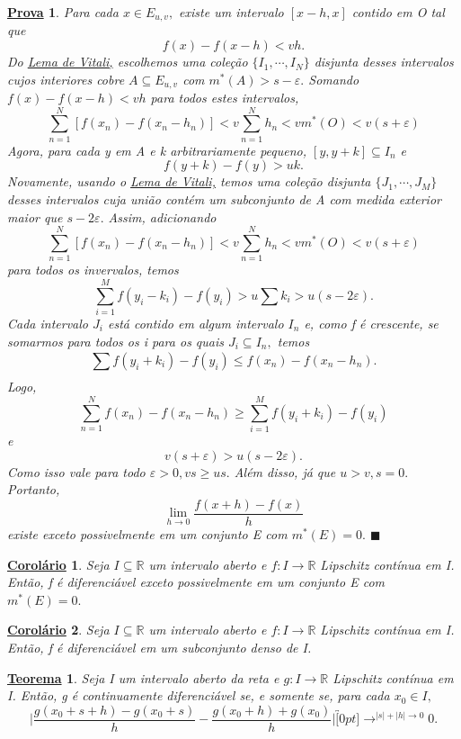 \documentclass{article}
\newtheorem*{theorem*}{\underline{Teorema}}
\newtheorem*{proof*}{\underline{Prova}}
\newtheorem*{crl*}{\underline{Corol\'ario}}
\renewcommand\qedsymbol{$\blacksquare$}
\begin{document}
\begin{proof*}
  Para cada \(x\in E_{u, v},\) existe um intervalo \([x-h, x]\) contido em O tal que 
    \[
      f(x) - f(x-h) < vh.
    \]
 Do \hyperlink{vitali_covering}{Lema de Vitali,} escolhemos uma cole\c cão \(\{I_{1}, \cdots, I_{N}\} \)
disjunta desses intervalos cujos interiores cobre \(A\subseteq{E_{u, v}}\) com
 \(m^{*}(A) > s-\varepsilon .\) Somando \(f(x) - f(x-h) < vh\) para todos estes intervalos, 
   \[
     \sum\limits_{n=1}^{N}[f(x_{n}) - f(x_{n}-h_{n})] < v \sum\limits_{n=1}^{N}h_{n} < vm^{*}(O) < v(s+\varepsilon )
   \]
   Agora, para cada y em A e k arbitrariamente pequeno, \([y, y+k]\subseteq{I_{n}}\) e 
     \[
       f(y+k)-f(y) > uk.
     \]
     Novamente, usando o \hyperlink{vitali_covering}{Lema de Vitali,} temos uma cole\c cão
     disjunta \(\{J_{1}, \cdots, J_{M}\}\) desses intervalos cuja união contém um 
    subconjunto de A com medida exterior maior que \(s-2\varepsilon .\) Assim,
    adicionando
   \[
     \sum\limits_{n=1}^{N}[f(x_{n}) - f(x_{n}-h_{n})] < v \sum\limits_{n=1}^{N}h_{n} < vm^{*}(O) < v(s+\varepsilon )
   \]
    para todos os invervalos, temos 
      \[
        \sum\limits_{i=1}^{M}f(y_{i}-k_{i})-f(y_{i}) > u\sum k_{i} > u (s-2\varepsilon ).
      \]
    Cada intervalo \(J_{i}\) está contido em algum intervalo \(I_{n}\) e, como f é
crescente, se somarmos para todos os i para os quais \(J_{i}\subseteq{I_{n}},\) temos 
        \[
          \sum\limits_{}^{}f(y_{i}+k_{i}) - f(y_{i})\leq f(x_{n}) - f(x_{n}-h_{n}).
        \]
    Logo, 
        \[
          \sum\limits_{n=1}^{N}f(x_{n})-f(x_{n}-h_{n})\geq \sum\limits_{i=1}^{M}f(y_{i}+k_{i}) - f(y_{i})
        \]
    e 
        \[
          v(s+\varepsilon ) > u(s-2\varepsilon ).
        \]
    Como isso vale para todo \(\varepsilon >0, vs\geq us.\) Além disso, já que 
    \(u > v, s=0.\) Portanto, 
      \[
        \lim_{h\to 0}\frac{f(x+h)-f(x)}{h}
      \]
    existe exceto possivelmente em um conjunto E com \(m^{*}(E) = 0.\) \qedsymbol
\end{proof*}
 \begin{crl*}
   Seja \(I\subseteq{\mathbb{R}}\) um intervalo aberto e \(f:I\rightarrow \mathbb{R}\) Lipschitz contínua em I.
  Então, f é diferenciável exceto possivelmente em um conjunto E com \(m^{*}(E) = 0.\)
 \end{crl*}
\begin{crl*}
  Seja \(I\subseteq{\mathbb{R}}\) um intervalo aberto e \(f:I\rightarrow \mathbb{R}\) Lipschitz contínua em I. Então, f é diferenciável em um
  subconjunto denso de I.
\end{crl*}
 \begin{theorem*}
   Seja I um intervalo aberto da reta e \(g:I\rightarrow \mathbb{R}\) Lipschitz contínua
   em I. Então, g é continuamente diferenciável se, e somente se, para cada \(x_{0}\in I,\) 
     \[
       \biggl|\frac{g(x_{0}+s+h)-g(x_{0}+s)}{h}-\frac{g(x_{0}+h)+g(x_{0})}{h}\biggr|\overbracket[0pt]{\longrightarrow}^{|s|+|h|\to 0}0.
     \]
 \end{theorem*}
\end{document}
